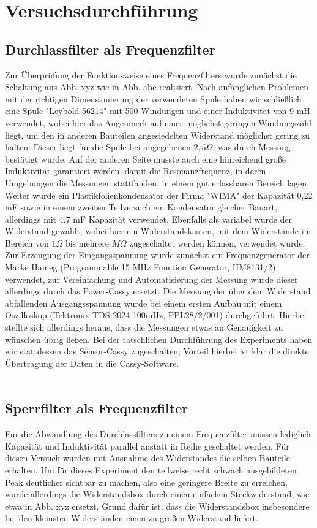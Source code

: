 \section{Versuchsdurchführung}

 \subsection{Durchlassfilter als Frequenzfilter}
Zur Überprüfung der Funktionsweise eines Frequenzfilters wurde zunächst die Schaltung aus
Abb. xyz wie in Abb. abc realisiert. Nach anfänglichen Problemen mit der richtigen Dimensionierung 
der verwendeten Spule haben wir schließlich eine Spule "Leybold 56214" mit 500 Windungen und einer 
Induktivität von 9 mH verwendet, wobei hier das Augenmerk auf einer möglichst geringen Windungszahl 
liegt, um den in anderen Bauteilen angesiedelten Widerstand möglichst gering zu halten. Dieser liegt 
für die Spule bei angegebenen $ 2,5  \Omega $, was durch Messung bestätigt wurde. Auf der anderen Seite 
musste auch eine hinreichend große Induktivität garantiert werden, damit die Resonanzfrequenz, in deren 
Umgebungen die Messungen stattfanden, in einem gut erfassbaren Bereich lagen. Weiter wurde ein 
Plastikfolienkondensator der Firma "WIMA" der Kapazität 0,22 mF sowie in einem zweiten Teilversuch
ein Kondensator gleicher Bauart, allerdings mit 4,7 mF Kapazität verwendet. Ebenfalls als variabel
wurde der Widerstand gewählt, wobei hier ein Widerstandskasten, mit dem Widerstände im Bereich von $ 
1  \Omega $ bis mehrere $ M \Omega $ zugeschaltet werden können, verwendet wurde. \\
Zur Erzeugung der Eingangsspannung wurde zunächst ein Frequenzgenerator der Marke Hameg (Programmable 
15 MHz Function Generator, HM8131/2) verwendet, zur Vereinfachung und Automatisierung der Messung wurde 
dieser allerdings durch das Power-Cassy ersetzt.
Die Messung der über dem Widerstand abfallenden Ausgangsspannung wurde bei einem ersten Aufbau mit 
einem Oszilloskop (Tektronix TDS 2024 100mHz, PPL28/2/001) durchgeführt. Hierbei stellte sich allerdings 
heraus, dass die Messungen etwas an Genauigkeit zu wünschen übrig ließen. Bei der tatschlichen 
Durchführung des Experiments haben wir stattdessen das Sensor-Cassy zugeschalten; Vorteil hierbei ist 
klar die direkte Übertragung der Daten in die Cassy-Software.\\
\\
\subsection{Sperrfilter als Frequenzfilter}
Für die Abwandlung des Durchlassfilters zu einem Frequenzfilter müssen lediglich Kapazität und
Induktivität parallel anstatt in Reihe geschaltet werden. Für diesen Versuch wurden mit Ausnahme des
Widerstandes die selben Bauteile erhalten. Um für dieses Experiment den teilweise recht schwach 
ausgebildeten Peak deutlicher sichtbar zu machen, also eine geringere Breite zu erreichen, wurde 
allerdings die Widerstandsbox durch einen einfachen Steckwiderstand, wie etwa in Abb. xyz ersetzt. 
Grund dafür ist, dass die Widerstandsbox insbesondere bei den kleinsten Widerständen einen zu großen 
Widerstand liefert.


